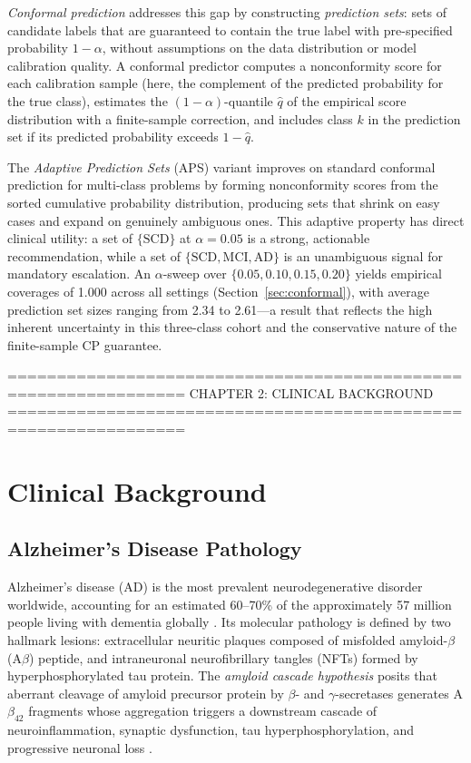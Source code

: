 \emph{Conformal prediction} \citep{shafer2008tutorial,
angelopoulos2023conformal} addresses this gap by constructing
\emph{prediction sets}: sets of candidate labels that are guaranteed to contain
the true label with pre-specified probability $1 - \alpha$, without assumptions
on the data distribution or model calibration quality. A conformal predictor
computes a nonconformity score for each calibration sample (here, the complement
of the predicted probability for the true class), estimates the
$(1 - \alpha)$-quantile $\hat{q}$ of the empirical score distribution with a
finite-sample correction, and includes class $k$ in the prediction set if its
predicted probability exceeds $1 - \hat{q}$.

The \emph{Adaptive Prediction Sets} (APS) variant \citep{angelopoulos2023conformal}
improves on standard conformal prediction for multi-class problems by forming
nonconformity scores from the sorted cumulative probability distribution,
producing sets that shrink on easy cases and expand on genuinely ambiguous ones.
This adaptive property has direct clinical utility: a set of $\{\text{SCD}\}$
at $\alpha = 0.05$ is a strong, actionable recommendation, while a set of
$\{\text{SCD}, \text{MCI}, \text{AD}\}$ is an unambiguous signal for mandatory
escalation. An $\alpha$-sweep over $\{0.05, 0.10, 0.15, 0.20\}$ yields
empirical coverages of 1.000 across all settings (Section~\ref{sec:conformal}),
with average prediction set sizes ranging from 2.34 to 2.61---a result that
reflects the high inherent uncertainty in this three-class cohort and the
conservative nature of the finite-sample CP guarantee.


================================================================
  CHAPTER 2: CLINICAL BACKGROUND
================================================================

\chapter{Clinical Background}
\label{chap:clinical-background}

\section{Alzheimer's Disease Pathology}
\label{sec:ad-pathology}

Alzheimer's disease (AD) is the most prevalent neurodegenerative disorder
worldwide, accounting for an estimated 60--70\% of the approximately 57 million
people living with dementia globally \citep{who2023dementia}. Its molecular
pathology is defined by two hallmark lesions: extracellular neuritic plaques
composed of misfolded amyloid-$\beta$ (A$\beta$) peptide, and intraneuronal
neurofibrillary tangles (NFTs) formed by hyperphosphorylated tau protein. The
\emph{amyloid cascade hypothesis} posits that aberrant cleavage of amyloid
precursor protein by $\beta$- and $\gamma$-secretases generates
A$\beta_{42}$ fragments whose aggregation triggers a downstream cascade of
neuroinflammation, synaptic dysfunction, tau hyperphosphorylation, and
progressive neuronal loss \citep{mckhann2011diagnosis}.


